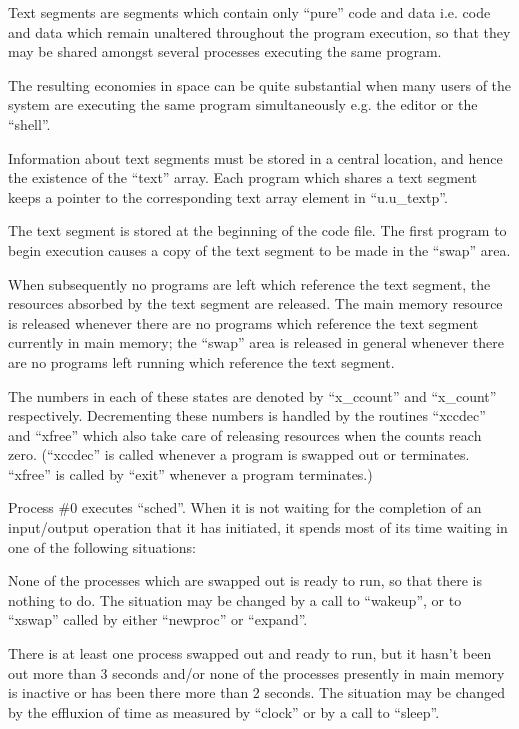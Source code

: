 Text segments are segments which contain only ``pure'' code and data i.e.
code and data which remain unaltered
throughout the program execution, so
that they may be shared amongst several
processes executing the same program.

The resulting economies in space can be
quite substantial when many users of
the system are executing the same program simultaneously e.g. the editor or
the ``shell''.

Information about text segments must be
stored in a central location, and hence
the existence of the ``text'' array. Each
program which shares a text segment
keeps a pointer to the corresponding
text array element in ``u.u\_textp''.

The text segment is stored at the
beginning of the code file. The first
program to begin execution causes a
copy of the text segment to be made in
the ``swap'' area.

When subsequently no programs are left
which reference the text segment, the
resources absorbed by the text segment
are released. The main memory resource
is released whenever there are no programs which reference the text segment
currently in main memory; the ``swap''
area is released in general whenever
there are no programs left running
which reference the text segment.


The numbers in each of these states are
denoted by ``x\_ccount'' and ``x\_count''
respectively. Decrementing these
numbers is handled by the routines
``xccdec'' and ``xfree'' which also take
care of releasing resources when the
counts reach zero. (``xccdec'' is called
whenever a program is swapped out or
terminates. ``xfree'' is called by ``exit''
whenever a program terminates.)


Process \#0 executes ``sched''. When it is
not waiting for the completion of an
input/output operation that it has initiated, it spends most of its time
waiting in one of the following situations:

\bd
 \item[A. (runout)]
 None of the processes which are
 swap\-ped out is ready to run, so
 that there is nothing to do. The
 situation may be changed by a call
 to ``wakeup'', or to ``xswap'' called
 by either ``newproc'' or ``expand''.

 \item[B. (runin)]
 There is at least one process
 swapped out and ready to run, but
 it hasn't been out more than 3
 seconds and/or none of the
 processes presently in main memory
 is inactive or has been there more
 than 2 seconds. The situation may
be changed by the effluxion of
time as measured by ``clock'' or by
a call to ``sleep''.
\ed

